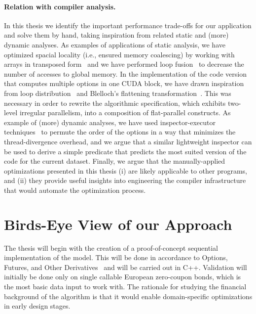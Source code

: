 
\paragraph{Relation with compiler analysis.} In this thesis we identify the important performance trade-offs for our application and solve them by hand, taking inspiration from related static and (more) dynamic analyses.  As examples of applications of static analysis, we have optimized spacial locality (i.e., ensured memory coalescing) by working with arrays in transposed form~\cite{LexiFiPricing} and we have performed loop fusion~\cite{PolyhedralOpt} to decrease the number of accesses to global memory. In the implementation of the code version that computes multiple options in one CUDA block, we have drawn inspiration from loop distribution~\cite{PolyhedralOpt} and Blelloch's flattening transformation~\cite{blelloch1994implementation}. This was necessary in order to rewrite the algorithmic specification, which exhibits two-level irregular parallelism, into a composition of flat-parallel constructs.  
%
As example of (more) dynamic analyses, we have used inspector-executor techniques~\cite{Strout:DataItReord,SummaryMonot} to permute the order of the options in a way that minimizes the thread-divergence overhead, and we argue that a similar lightweight inspector can be used to derive a simple predicate that predicts the most suited version of the code for the current dataset.
%
Finally, we argue that the manually-applied optimizations presented in this thesis (i) are likely applicable to other programs, and (ii) they provide useful insights into engineering the compiler infrastructure that would automate the optimization process.

\section{Birds-Eye View of our Approach}
\label{section:solution}
The thesis will begin with the creation of a proof-of-concept sequential implementation of the model. This will be done in accordance to Options, Futures, and Other Derivatives~\cite{ofod} and will be carried out in C++. Validation will initially be done only on single callable European zero-coupon bonds, which is the most basic data input to work with. The rationale for studying the financial background of the  algorithm is that it would enable domain-specific optimizations in early design stages.

